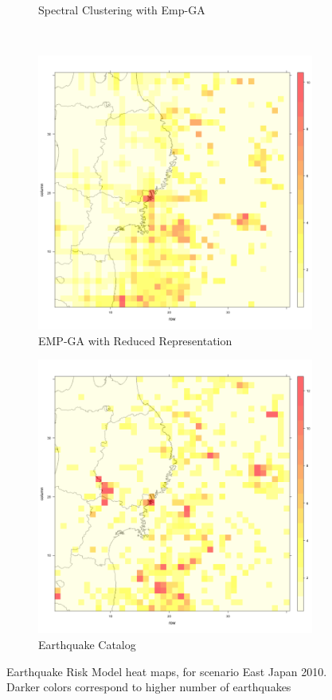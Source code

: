 \begin{figure}
\begin{subfigure}{.5\textwidth}
  \caption{Spectral Clustering with Emp-GA}
  \label{fig:sub2}
\end{subfigure}\\
\begin{subfigure}{.5\textwidth}
  \centering
  \includegraphics[width=1\linewidth]{img/EMP-RED-ga}
  \caption{EMP-GA with Reduced Representation}
  \label{fig:sub3}
\end{subfigure}%
\begin{subfigure}{.5\textwidth}
  \centering
  \includegraphics[width=1\linewidth]{img/realEastJapan_2010}
  \caption{Earthquake Catalog}
  \label{fig:sub4}
\end{subfigure}
\caption{Earthquake Risk Model heat maps, for scenario East Japan
  2010. Darker colors correspond to higher number of earthquakes}
\label{fig:heatmap}
\end{figure}

